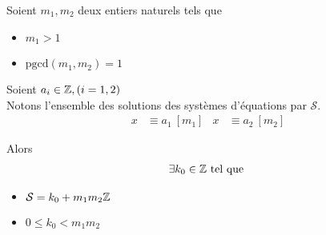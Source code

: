 \begin{graybox}
    \begin{theoreme}
        Soient $m_1, m_2$ deux entiers naturels tels que 
        \begin{itemize}
            \item $m_1 > 1$
            \item $\mathrm{pgcd}(m_1, m_2) = 1$
        \end{itemize}
        Soient $a_i \in \mathbb{Z}, (i = 1, 2)$
        \\
        Notons l'ensemble des solutions des systèmes d'équations par $\mathcal{S}$.
        \begin{align*}
            x &\equiv a_1 \ [m_1] & x &\equiv a_2 \ [m_2]
        \end{align*}
    \end{theoreme}
    Alors 
    \begin{align*}
        \exists k_0 \in \mathbb{Z} \text{ tel que } 
    \end{align*}
    \begin{itemize}
        \item $\mathcal{S} = k_0 + m_1 m_2 \mathbb{Z}$
        \item $0 \leq k_0 < m_1 m_2$
    \end{itemize}
\end{graybox}


